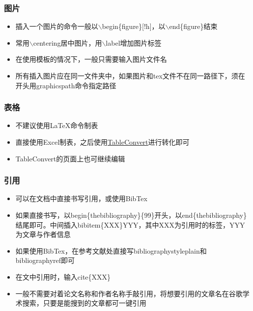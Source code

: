 \documentclass{beamer}
\begin{document}
\begin{frame} 
    \frametitle{图片} 
    \begin{itemize} 
        \item 插入一个图片的命令一般以{$\backslash$begin\{figure\}[!h]}，以$\backslash$end\{figure\}结束
        \item 常用$\backslash$centering居中图片，用$\backslash$label增加图片标签
        \item 在使用模板的情况下，一般只需要输入图片文件名
        \item 所有插入图片应在同一文件夹中，如果图片和tex文件不在同一路径下，须在开头用graphicspath命令指定路径
    \end{itemize} 
\end{frame}

\begin{frame} 
    \frametitle{表格} 
    \begin{itemize} 
        \item 不建议使用\LaTeX{}命令制表
        \item 直接使用Excel制表，之后使用\href{https://tableconvert.com/}{TableConvert}进行转化即可
        \item TableConvert的页面上也可继续编辑
    \end{itemize} 
\end{frame}

\begin{frame} 
    \frametitle{引用} 
    \begin{itemize} 
        \item 可以在文档中直接书写引用，或使用BibTex
        \item 如果直接书写，以begin\{thebibliography\}\{99\}开头，以end\{thebibliography\}结尾即可。中间插入bibitem\{XXX\}YYY，其中XXX为引用时的标签，YYY为文章与作者信息
        \item 如果使用BibTex，在参考文献处直接写bibliographystyle{plain}和bibliography{ref}即可
        \item 在文中引用时，输入cite\{XXX\}
        \item 一般不需要对着论文名称和作者名称手敲引用，将想要引用的文章名在谷歌学术搜索，只要是能搜到的文章都可一键引用
    \end{itemize} 
\end{frame}
\end{document}
